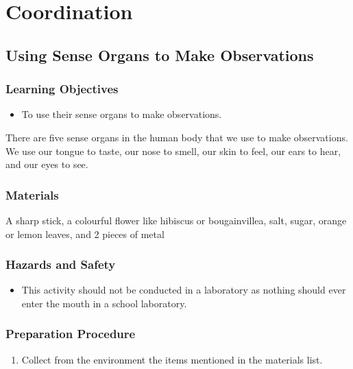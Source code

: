 \section{Coordination}
\subsection{Using Sense Organs to Make Observations}
\subsubsection*{Learning Objectives}
\begin{itemize}
\item{To use their sense organs to make observations.}
\end{itemize}


There are five sense organs in the human body that we use to make observations. We use our tongue to taste, our nose to smell, our skin to feel, our ears to hear, and our eyes to see.

\subsubsection*{Materials}
A sharp stick, a colourful flower like hibiscus or bougainvillea, salt, sugar, orange or lemon leaves, and 2 pieces of metal

\subsubsection*{Hazards and Safety}
\begin{itemize}
\item{This activity should not be conducted in a laboratory as nothing should ever enter the mouth in a school laboratory.}
\end{itemize}

\subsubsection*{Preparation Procedure}
\begin{enumerate}
\item{Collect from the environment the items mentioned in the materials list.}
\end{enumerate}

